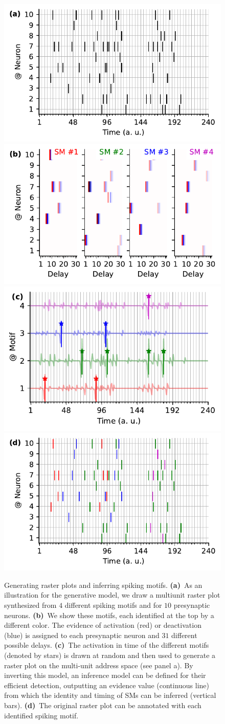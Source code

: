 \documentclass[runningheads]{llncs}
\begin{document}
\begin{figure}%
\begin{center}
  \includegraphics[width=.40\linewidth]{figures/THC_toy-a_k.pdf}
  \includegraphics[width=.40\linewidth]{figures/THC_toy-b.pdf}
  \\
  \includegraphics[width=.40\linewidth]{figures/THC_toy-c.pdf}
  \includegraphics[width=.40\linewidth]{figures/THC_toy-a.pdf} 
\end{center}
\caption{Generating raster plots and inferring spiking motifs. \textbf{(a)}~As an illustration for the generative model, we draw a multiunit raster plot synthesized from $4$ different spiking motifs and for $10$ presynaptic neurons. \textbf{(b)}~We show these motifs, each identified at the top by a different color. The evidence of activation (red) or deactivation (blue) is assigned to each presynaptic neuron and $31$ different possible delays. \textbf{(c)}~The activation in time of the different motifs (denoted by stars) is drawn at random and then used to generate a raster plot on the multi-unit address space (see panel a). By inverting this model, an inference model can be defined for their efficient detection, outputting an evidence value (continuous line) from which the identity and timing of SMs can be inferred (vertical bars). \textbf{(d)}~The original raster plot can be annotated with each identified spiking motif.
}
\label{fig:THC}
\end{figure}
\end{document}
